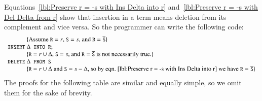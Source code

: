 \documentclass{elsarticle}
\begin{document}
	Equations~\ref{lbl:Preserve r = -s with Ins Delta into r} and~\ref{lbl:Preserve r = -s with Del Delta from r}
	show that insertion in a term means deletion from its complement and vice versa.
	So the programmer can write the following code:
\[\begin{array}{r@{~}l}
&\{\text{Assume $\code{R}=r$, $\code{S}=s$, and $\code{R}=\cmpl{\code{S}}$}\}\\
\code{INSERT}&\Delta\code{ INTO R};\\
&\{\text{$\code{R}=r\cup\Delta$, $\code{S}=s$, and $\code{R}=\cmpl{\code{S}}$ is not necessarily true.}\}\\
\code{DELETE}&\Delta\code{ FROM S}\\
&\{\text{$\code{R}=r\cup\Delta$ and $\code{S}=s-\Delta$, so by eqn.~\ref{lbl:Preserve r = -s with Ins Delta into r} we have $\code{R}=\cmpl{\code{S}}$}\}
\end{array}\]
	The proofs for the following table are similar and equally simple,
	so we omit them for the sake of brevity.
% 
\end{document}
